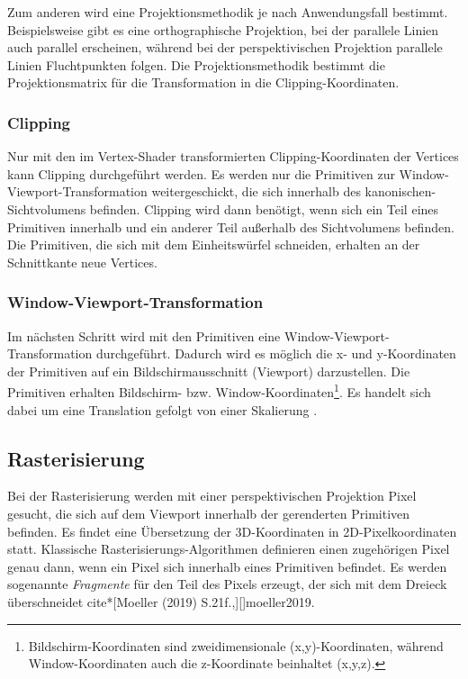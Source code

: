 Zum anderen wird eine Projektionsmethodik je nach Anwendungsfall bestimmt. Beispielsweise gibt es eine orthographische Projektion, bei der parallele Linien auch parallel erscheinen, während bei der perspektivischen Projektion parallele Linien Fluchtpunkten folgen. Die Projektionsmethodik bestimmt die Projektionsmatrix für die Transformation in die Clipping-Koordinaten.

\subsubsection{Clipping}
\label{grp-geometrieverarbeitung-clipping}
Nur mit den im Vertex-Shader transformierten Clipping-Koordinaten der Vertices kann Clipping durchgeführt werden. Es werden nur die Primitiven zur Window-Viewport-Transformation weitergeschickt, die sich innerhalb des kanonischen-Sichtvolumens befinden. Clipping wird dann benötigt, wenn sich ein Teil eines Primitiven innerhalb und ein anderer Teil außerhalb des Sichtvolumens befinden. Die Primitiven, die sich mit dem Einheitswürfel schneiden, erhalten an der Schnittkante neue Vertices\cite*[Moeller (2019)][]{moeller2019}.

\subsubsection{Window-Viewport-Transformation}
\label{grp-geometrieverarbeitung-window-viewport-transformation}
Im nächsten Schritt wird mit den Primitiven eine Window-Viewport-Transformation durchgeführt. Dadurch wird es möglich die x- und y-Koordinaten der Primitiven auf ein Bildschirmausschnitt (Viewport) darzustellen. Die Primitiven erhalten Bildschirm- bzw. Window-Koordinaten\footnote{Bildschirm-Koordinaten sind zweidimensionale (x,y)-Koordinaten, während Window-Koordinaten auch die z-Koordinate beinhaltet (x,y,z).}. Es handelt sich dabei um eine Translation gefolgt von einer Skalierung\cite*[Moeller (2019) S.20f.,][]{moeller2019} \cite*[Nischwitz (2012) S.150,][]{nischwitz2012}.

\subsection{Rasterisierung}
\label{grp-rasterisierung}
Bei der Rasterisierung werden mit einer perspektivischen Projektion Pixel gesucht, die sich auf dem Viewport innerhalb der gerenderten Primitiven befinden. Es findet eine Übersetzung der 3D-Koordinaten in 2D-Pixelkoordinaten statt. Klassische Rasterisierungs-Algorithmen definieren einen zugehörigen Pixel genau dann, wenn ein Pixel sich innerhalb eines Primitiven befindet. Es werden sogenannte \textit{Fragmente} für den Teil des Pixels erzeugt, der sich mit dem Dreieck überschneidet\cite*[][, zuletzt aufgerufen am 11.07.2022]{scratchapixel} cite*[Moeller (2019) S.21f.,][]{moeller2019}. 

